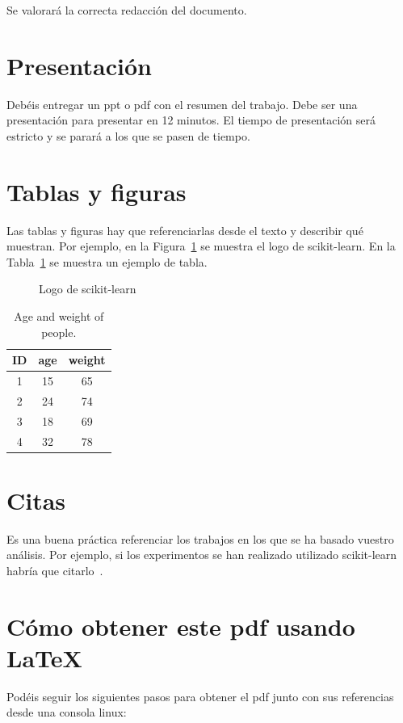 \documentclass{esannV2}
\begin{document}
Se valorará la correcta redacción del documento.

\section{Presentación}
Debéis entregar un ppt o pdf con el resumen del trabajo. Debe ser una
presentación para presentar en 12 minutos. El tiempo de presentación será
estricto y se parará a los que se pasen de tiempo.

\section{Tablas y figuras}
Las tablas y figuras hay que referenciarlas desde el texto y describir qué
muestran. Por ejemplo, en la Figura~\ref{fig:logo} se muestra el logo de
scikit-learn. En la Tabla~\ref{tab:ageweight} se muestra un ejemplo de tabla.


\begin{figure}[b!]
\centering
\caption{Logo de scikit-learn}\label{fig:logo}
\end{figure}

\begin{table}[t!]
  \centering
  \begin{tabular}{|c|c|c|}
    \hline
    ID & age & weight \\
    \hline
    1& 15 & 65 \\
    2& 24 & 74\\
    3& 18 & 69 \\
    4& 32 & 78 \\
    \hline
  \end{tabular}
  \caption{Age and weight of people.}\label{tab:ageweight}
\end{table}

\section{Citas}
Es una buena práctica referenciar los trabajos en los que se ha basado vuestro
análisis. Por ejemplo, si los experimentos se han realizado utilizado
scikit-learn habría que citarlo~\cite{scikit-learn}.

\section{Cómo obtener este pdf usando \LaTeX}
Podéis seguir los siguientes pasos para obtener el pdf junto con sus
referencias desde una consola linux:
\end{document}
